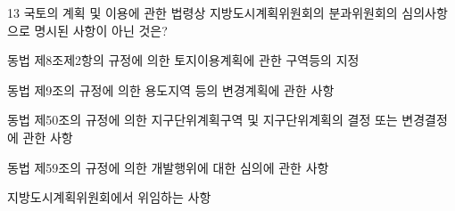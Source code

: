 \begin{question}{13}
국토의 계획 및 이용에 관한 법령상 지방도시계획위원회의 분과위원회의 심의사항으로 명시된 사항이 아닌 것은?
\begin{choices}
  \item 동법 제8조제2항의 규정에 의한 토지이용계획에 관한 구역등의 지정
  \item 동법 제9조의 규정에 의한 용도지역 등의 변경계획에 관한 사항
  \item 동법 제50조의 규정에 의한 지구단위계획구역 및 지구단위계획의 결정 또는 변경결정에 관한 사항
  \item 동법 제59조의 규정에 의한 개발행위에 대한 심의에 관한 사항
  \item 지방도시계획위원회에서 위임하는 사항
\end{choices}
\end{question}
